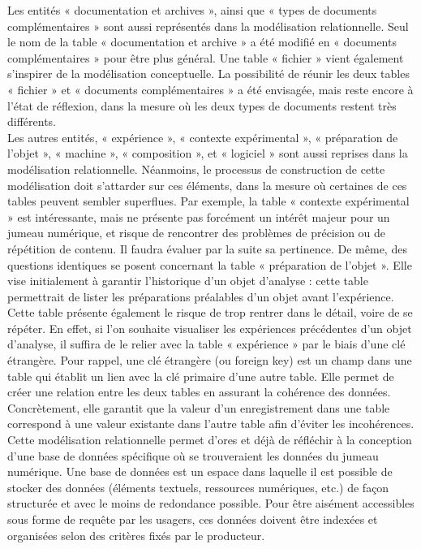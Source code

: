 Les entités « documentation et archives », ainsi que « types de documents complémentaires » sont aussi représentés dans la modélisation relationnelle. Seul le nom de la table « documentation et archive » a été modifié en « documents complémentaires » pour être plus général. Une table « fichier » vient également s’inspirer de la modélisation conceptuelle. La possibilité de réunir les deux tables « fichier » et « documents complémentaires » a été envisagée, mais reste encore à l’état de réflexion, dans la mesure où les deux types de documents restent très différents.\\
 
Les autres entités, « expérience », « contexte expérimental », « préparation de l’objet », « machine », « composition », et « logiciel » sont aussi reprises dans la modélisation relationnelle. Néanmoins, le processus de construction de cette modélisation doit s’attarder sur ces éléments, dans la mesure où certaines de ces tables peuvent sembler superflues. Par exemple, la table « contexte expérimental » est intéressante, mais ne présente pas forcément un intérêt majeur pour un jumeau numérique, et risque de rencontrer des problèmes de précision ou de répétition de contenu. Il faudra évaluer par la suite sa pertinence. De même, des questions identiques se posent concernant la table « préparation de l’objet ». Elle vise initialement à garantir l’historique d’un objet d’analyse : cette table permettrait de lister les préparations préalables d’un objet avant l’expérience. Cette table présente également le risque de trop rentrer dans le détail, voire de se répéter. En effet, si l’on souhaite visualiser les expériences précédentes d’un objet d’analyse, il suffira de le relier avec la table « expérience » par le biais d’une clé étrangère. Pour rappel, une clé étrangère (ou foreign key) est un champ dans une table qui établit un lien avec la clé primaire d'une autre table. Elle permet de créer une relation entre les deux tables en assurant la cohérence des données. Concrètement, elle garantit que la valeur d’un enregistrement dans une table correspond à une valeur existante dans l’autre table afin d’éviter les incohérences.\\

Cette modélisation relationnelle permet d'ores et déjà de réfléchir à la conception d'une base de données spécifique où se trouveraient les données du jumeau numérique. Une base de données est un espace dans laquelle il est possible de stocker des données (éléments textuels, ressources numériques, etc.) de façon structurée et avec le moins de redondance possible. Pour être aisément accessibles sous forme de requête par les usagers, ces données doivent être indexées et organisées selon des critères fixés par le producteur. 

